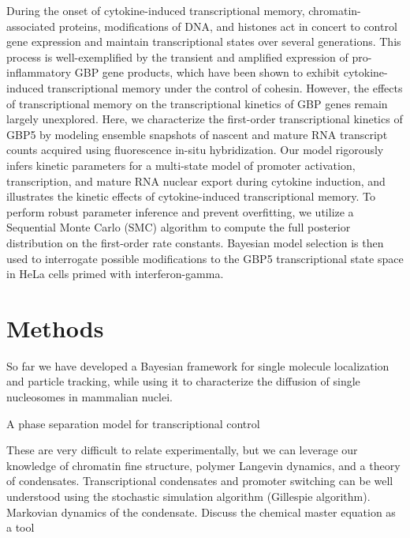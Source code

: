 \documentclass{article}
\begin{document}
During the onset of cytokine-induced transcriptional memory, chromatin-associated proteins, modifications of DNA, and histones act in concert to control gene expression and maintain transcriptional states over several generations. This process is well-exemplified by the transient and amplified expression of pro-inflammatory GBP gene products, which have been shown to exhibit cytokine-induced transcriptional memory under the control of cohesin. However, the effects of transcriptional memory on the transcriptional kinetics of GBP genes remain largely unexplored. Here, we characterize the first-order transcriptional kinetics of GBP5 by modeling ensemble snapshots of nascent and mature RNA transcript counts acquired using fluorescence in-situ hybridization. Our model rigorously infers kinetic parameters for a multi-state model of promoter activation, transcription, and mature RNA nuclear export during cytokine induction, and illustrates the kinetic effects of cytokine-induced transcriptional memory. To perform robust parameter inference and prevent overfitting, we utilize a Sequential Monte Carlo (SMC) algorithm to compute the full posterior distribution on the first-order rate constants. Bayesian model selection is then used to interrogate possible modifications to the GBP5 transcriptional state space in HeLa cells primed with interferon-gamma. 

 

\section{Methods}

 
So far we have developed a Bayesian framework for single molecule localization and particle tracking, while using it to characterize the diffusion of single nucleosomes in mammalian nuclei. 

 

A phase separation model for transcriptional control 

These are very difficult to relate experimentally, but we can leverage our knowledge of chromatin fine structure, polymer Langevin dynamics, and a theory of condensates. Transcriptional condensates and promoter switching can be well understood using the stochastic simulation algorithm (Gillespie algorithm). Markovian dynamics of the condensate. Discuss the chemical master equation as a tool \cite{Morrison2021}

 



 
\end{document}
